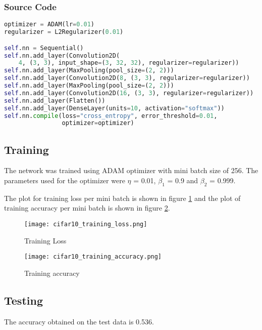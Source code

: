 \documentclass{article}
\begin{document}
\subsubsection{Source Code}
\begin{lstlisting}[language=python]
optimizer = ADAM(lr=0.01)
regularizer = L2Regularizer(0.01)

self.nn = Sequential()
self.nn.add_layer(Convolution2D(
    4, (3, 3), input_shape=(3, 32, 32), regularizer=regularizer))
self.nn.add_layer(MaxPooling(pool_size=(2, 2)))
self.nn.add_layer(Convolution2D(8, (3, 3), regularizer=regularizer))
self.nn.add_layer(MaxPooling(pool_size=(2, 2)))
self.nn.add_layer(Convolution2D(16, (3, 3), regularizer=regularizer))
self.nn.add_layer(Flatten())
self.nn.add_layer(DenseLayer(units=10, activation="softmax"))
self.nn.compile(loss="cross_entropy", error_threshold=0.01,
                optimizer=optimizer)
\end{lstlisting}

\subsection{Training}
The network was trained using ADAM optimizer with mini batch size of 256. The parameters
used for the optimizer were $\eta$ = 0.01, $\beta_1$ = 0.9 and 
$\beta_2$ = 0.999.

The plot for training loss per mini batch is shown in figure {\ref{fig:training_loss}}
and the plot of training accuracy per mini batch is shown in figure {\ref{fig:training_accuracy}}.

\begin{figure}[!ht]
  \texttt{[image: cifar10\_training\_loss.png]}
  \caption{Training Loss}
  \label{fig:training_loss}
\end{figure}

\begin{figure}[!ht]
  \texttt{[image: cifar10\_training\_accuracy.png]}
  \caption{Training accuracy}
  \label{fig:training_accuracy}
\end{figure}

\subsection{Testing}
The accuracy obtained on the test data is 0.536.
\end{document}
